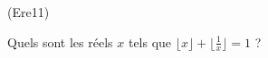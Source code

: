 \begin{tiny}(Ere11)\end{tiny} Quels sont les réels $x$ tels que
$ \lfloor x \rfloor + \lfloor \frac{1}{x} \rfloor = 1$ ?